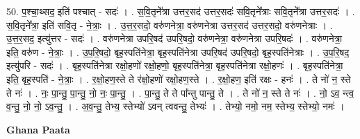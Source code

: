 \documentclass[17pt]{extarticle}
\begin{document}
50. प॒श्चा॒थ्सद॒ इति॑ पश्चात् - सदः॑ । . स॒वि॒तृने᳚त्रा उत्तर॒सद॑ उत्तर॒सदः॑ सवि॒तृने᳚त्राः सवि॒तृने᳚त्रा उत्तर॒सदः॑ । . स॒वि॒तृने᳚त्रा॒ इति॑ सवि॒तृ - ने॒त्राः॒ । . उ॒त्त॒र॒सदो॒ वरु॑णनेत्रा॒ वरु॑णनेत्रा उत्तर॒सद॑ उत्तर॒सदो॒ वरु॑णनेत्राः । . उ॒त्त॒र॒सद॒ इत्यु॑त्तर - सदः॑ । . वरु॑णनेत्रा उपरि॒षद॑ उपरि॒षदो॒ वरु॑णनेत्रा॒ वरु॑णनेत्रा उपरि॒षदः॑ । . वरु॑णनेत्रा॒ इति॒ वरु॑ण - ने॒त्राः॒ । . उ॒प॒रि॒षदो॒ बृह॒स्पति॑नेत्रा॒ बृह॒स्पति॑नेत्रा उपरि॒षद॑ उपरि॒षदो॒ बृह॒स्पति॑नेत्राः । . उ॒प॒रि॒षद॒ इत्यु॑परि - सदः॑ । . बृह॒स्पति॑नेत्रा रक्षो॒हणो॑ रक्षो॒हणो॒ बृह॒स्पति॑नेत्रा॒ बृह॒स्पति॑नेत्रा रक्षो॒हणः॑ । . बृह॒स्पति॑नेत्रा॒ इति॒ बृह॒स्पति॑ - ने॒त्राः॒ । . र॒क्षो॒हण॒स्ते ते र॑क्षो॒हणो॑ रक्षो॒हण॒स्ते । . र॒क्षो॒हण॒ इति॑ रक्षः - हनः॑ । . ते नो॑ न॒ स्ते ते नः॑ । . नः॒ पा॒न्तु॒ पा॒न्तु॒ नो॒ नः॒ पा॒न्तु॒ । . पा॒न्तु॒ ते ते पा᳚न्तु पान्तु॒ ते । . ते नो॑ न॒ स्ते ते नः॑ । . नो॒ ऽव॒ न्त्व॒ व॒न्तु॒ नो॒ नो॒ ऽव॒न्तु॒ । . अ॒व॒न्तु॒ तेभ्य॒ स्तेभ्यो॑ ऽवन् त्ववन्तु॒ तेभ्यः॑ । . तेभ्यो॒ नमो॒ नम॒ स्तेभ्य॒ स्तेभ्यो॒ नमः॑ । \newline

\textbf{Ghana Paata } \newline
\end{document}
